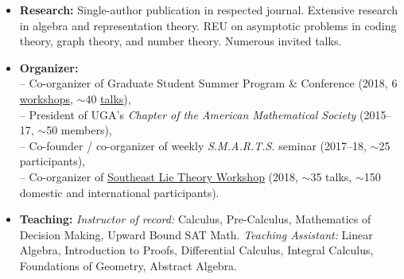 \documentclass[10pt,a4paper]{article}
\begin{document}
{%


\spacedhrule{0.5em}{-0.4em}

\begin{itemize}
\item \textbf{Research:} Single-author publication in respected journal. Extensive research in algebra and representation theory. REU on asymptotic problems in coding theory, graph theory, and number theory. Numerous invited talks.
\item \textbf{Organizer:}
  \\ \null \hspace{0.2em} -- Co-organizer of Graduate Student Summer Program \& Conference (2018, 6 \href{https://research.franklin.uga.edu/agant/professional-development-summer-2018}{workshops}, $\sim$40 \href{https://research.franklin.uga.edu/agant/mock-ams-conference-2018}{talks}),
  \\ \null \hspace{0.2em} -- President of UGA's \emph{Chapter of the American Mathematical Society} (2015--17, $\sim$50 members),
  \\ \null \hspace{0.2em} -- Co-founder / co-organizer of weekly \emph{S.M.A.R.T.S.} seminar (2017--18, $\sim$25 participants),
  \\ \null \hspace{0.2em} -- Co-organizer of \href{https://www.math.lsu.edu/~pramod/selie/10/}{Southeast Lie Theory Workshop} (2018, $\sim$35 talks, $\sim$150 domestic and international participants).
\item \textbf{Teaching:} \emph{Instructor of record:} Calculus, Pre-Calculus, Mathematics of Decision Making, Upward Bound SAT Math. \emph{Teaching Assistant:} Linear Algebra, Introduction to Proofs, Differential Calculus, Integral Calculus, Foundations of Geometry, Abstract Algebra.

\end{itemize}}
\end{document}
